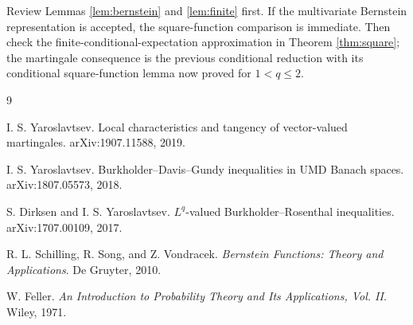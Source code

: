 \documentclass[11pt]{article}
\begin{document}
Review Lemmas \ref{lem:bernstein} and \ref{lem:finite} first.  If the
multivariate Bernstein representation is accepted, the square-function
comparison is immediate.  Then check the finite-conditional-expectation
approximation in Theorem \ref{thm:square}; the martingale consequence is the
previous conditional reduction with its conditional square-function lemma now
proved for \(1<q\le2\).

\begin{thebibliography}{9}

I. S. Yaroslavtsev.
\newblock Local characteristics and tangency of vector-valued martingales.
\newblock arXiv:1907.11588, 2019.

I. S. Yaroslavtsev.
\newblock Burkholder--Davis--Gundy inequalities in UMD Banach spaces.
\newblock arXiv:1807.05573, 2018.

S. Dirksen and I. S. Yaroslavtsev.
\newblock \(L^q\)-valued Burkholder--Rosenthal inequalities.
\newblock arXiv:1707.00109, 2017.

R. L. Schilling, R. Song, and Z. Vondracek.
\newblock \emph{Bernstein Functions: Theory and Applications}.
\newblock De Gruyter, 2010.

W. Feller.
\newblock \emph{An Introduction to Probability Theory and Its Applications,
  Vol. II}.
\newblock Wiley, 1971.

\end{thebibliography}
\end{document}
